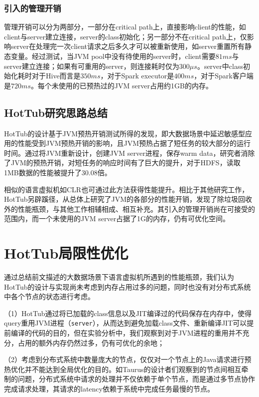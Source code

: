 \documentclass[lang=cn,12pt,a4paper,cite=authoryear]{elegantpaper}
\begin{document}
\begin{figure*}[!htp]
\subsubsection{引入的管理开销}
管理开销可以分为两部分，一部分在critical path上，直接影响client的性能，如client与server建立连接，server的class初始化；另一部分不在critical path上，仅影响server在处理完一次client请求之后多久才可以被重新使用，如server重置所有静态变量。经过测试，当JVM pool中没有待使用的server时，client需要$81ms$与server建立连接；如果有可重用的server，则连接耗时仅为$300\mu{}s$。server中class初始化耗时对于Hive而言是$350ms$，对于Spark executor是$400ms$，对于Spark客户端是$720ms$。每个未使用的已预热过的JVM server占用约1GB的内存。

\subsection{HotTub研究思路总结}
HotTub的设计基于JVM预热开销测试所得的发现，即大数据场景中延迟敏感型应用的性能受到JVM预热开销的影响，且JVM预热占据了短任务的较大部分的运行时间。通过将JVM重新设计，创建JVM server进程，保存warm data，研究者消除了JVM的预热开销，对短任务的响应时间有了巨大的提升，对于HDFS，读取1MB数据的性能被提升了30.08倍。

相似的语言虚拟机如CLR也可通过此方法获得性能提升。相比于其他研究工作，HotTub另辟蹊径，从总体上研究了JVM的各部分的性能开销，发现了除垃圾回收外的性能瓶颈，与其他工作相辅相成、相互补充。其引入的管理开销尚在可接受的范围内，而一个未使用的JVM server占据了1G的内存，仍有可优化空间。

\section{HotTub局限性优化}
通过总结前文描述的大数据场景下语言虚拟机所遇到的性能瓶颈，我们认为HotTub的设计与实现尚未考虑到内存占用过多的问题，同时也没有对分布式系统中各个节点的状态进行考虑。

（1）HotTub通过将已加载的class信息以及JIT编译过的代码保存在内存中，使得query重用JVM进程（\texttt{server}），从而达到避免加载class文件、重新编译JIT可以提前编译的代码的目的，但在实验分析中，我们观察到对于JVM进程的重用并不充分，占用的额外内存仍然过多，仍有可优化的余地；

（2）考虑到分布式系统中数量庞大的节点，仅仅对一个节点上的Java请求进行预热优化并不能达到全局优化的目的。如Taurus\cite{DBLP:conf/asplos/MaasA0K16}的设计者们观察到的节点间相互牵制的问题，分布式系统中请求的处理并不仅依赖于单个节点，而是通过多节点协作完成请求处理，其请求的latency依赖于系统中完成任务最慢的节点。


\end{figure*}
\end{document}
